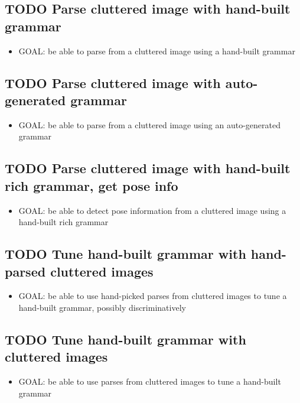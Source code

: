 \documentclass{book}
\begin{document}
\subsection{\textbf{TODO} Parse cluttered image with hand-built grammar}
\label{sec-5_29_2}

\begin{itemize}
\item GOAL: be able to parse from a cluttered image using a hand-built
    grammar
\end{itemize}
\subsection{\textbf{TODO} Parse cluttered image with auto-generated grammar}
\label{sec-5_29_3}

\begin{itemize}
\item GOAL: be able to parse from a cluttered image using an
    auto-generated grammar
\end{itemize}
\subsection{\textbf{TODO} Parse cluttered image with hand-built rich grammar, get pose info}
\label{sec-5_29_4}

\begin{itemize}
\item GOAL: be able to detect pose information from a cluttered image
    using a hand-built rich grammar
\end{itemize}
\subsection{\textbf{TODO} Tune hand-built grammar with hand-parsed cluttered images}
\label{sec-5_29_5}

\begin{itemize}
\item GOAL: be able to use hand-picked parses from cluttered images to
    tune a hand-built grammar, possibly discriminatively
\end{itemize}
\subsection{\textbf{TODO} Tune hand-built grammar with cluttered images}
\label{sec-5_29_6}

\begin{itemize}
\item GOAL: be able to use parses from cluttered images to tune a
    hand-built grammar
\end{itemize}
\end{document}

